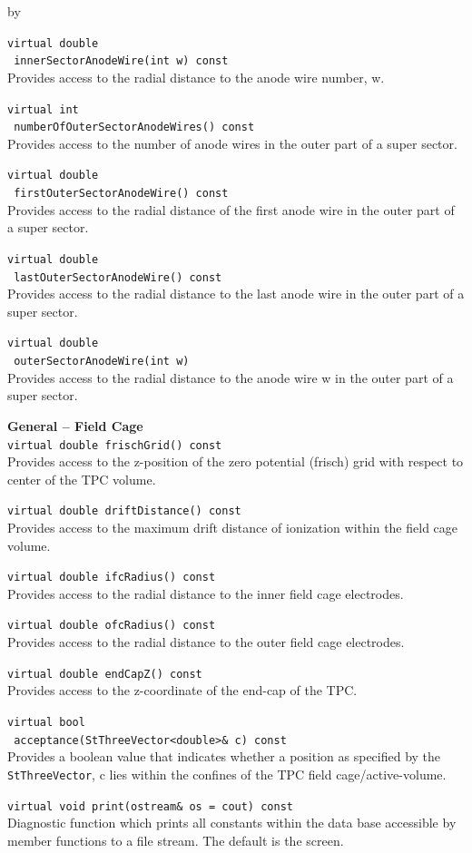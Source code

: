 \documentclass[twoside]{article}
\newcommand{\comp}[1]{\texttt{#1}}%
\newcommand{\entrylabel}[1]{\mbox{\textbf{{#1}}}\hfil}%
\newenvironment{entry}
{\begin{list}{}%
    {\renewcommand{\makelabel}{\entrylabel}%
     \setlength{\labelwidth}{90pt}%
     \setlength{\leftmargin}{\labelwidth}
     \advance\leftmargin by \labelsep%
      }%
    }%
  {\end{list}}
\newcommand{\Entrylabel}[1]%
{\raisebox{0pt}[1ex][0pt]{\makebox[\labelwidth][l]%
    {\parbox[t]{\labelwidth}{\hspace{0pt}\textbf{{#1}}}}}}
\newenvironment{Entry}%
{\renewcommand{\entrylabel}{\Entrylabel}\begin{entry}}%
  {\end{entry}}
\begin{document}
\begin{Entry}
  \verb+virtual double+\\
  \verb+ innerSectorAnodeWire(int w) const+\\
  Provides access to the radial distance to the anode wire number, w.

  \verb+virtual int+\\
  \verb+ numberOfOuterSectorAnodeWires() const+\\
  Provides access to the number of anode wires in the outer part
  of a super sector.

  \verb+virtual double+\\
  \verb+ firstOuterSectorAnodeWire() const+\\
  Provides access to the radial distance of the first anode wire in
  the outer part of a super sector.

  \verb+virtual double+\\
  \verb+ lastOuterSectorAnodeWire() const+\\
  Provides access to the radial distance to the last anode wire in the outer
  part of a super sector.

  \verb+virtual double+\\
  \verb+ outerSectorAnodeWire(int w)+\\
  Provides access to the radial distance to the anode wire w in the outer part
  of a super sector.
    
  {\bf  General -- Field Cage \\}
  \verb+virtual double frischGrid() const+\\
  Provides access to the z-position of the zero potential (frisch) grid
  with respect to center of the TPC volume.

  \verb+virtual double driftDistance() const+\\
  Provides access to the maximum drift distance of ionization within
  the field cage volume.
    
  \verb+virtual double ifcRadius() const+\\
  Provides access to the radial distance to the inner field cage electrodes.

  \verb+virtual double ofcRadius() const+\\
  Provides access to the radial distance to the outer field cage electrodes.

  \verb+virtual double endCapZ() const+\\
  Provides access to the z-coordinate of the end-cap of the TPC.

  \verb+virtual bool+\\
  \verb+ acceptance(StThreeVector<double>& c) const+\\
  Provides a boolean value that indicates whether a position
  as specified by the \comp{StThreeVector}, c lies within the confines
  of the TPC field cage/active-volume.

  \verb+virtual void print(ostream& os = cout) const+\\
  Diagnostic function which prints all constants within
  the data base accessible by member functions to
  a file stream.  The default is the screen.  

\end{Entry}
\clearpage
\end{document}
